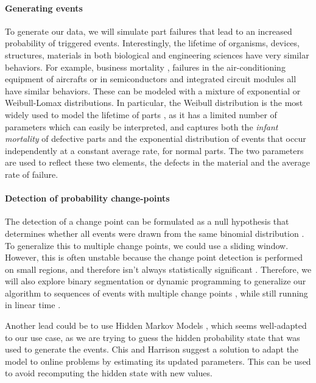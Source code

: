 \documentclass{kththesis}
\begin{document}

\paragraph{Generating events}
\label{part-lifetime}

To generate our data, we will simulate part failures that lead to an increased probability of triggered events. Interestingly, the lifetime of organisms, devices, structures, materials in both biological and engineering sciences have very similar behaviors. 
For example, business mortality \parencite{lomax1954}, failures in the air-conditioning equipment of aircrafts or in semiconductors \parencite{proschan1963} and integrated circuit modules \cite{saunders1983} all have similar behaviors. 
These can be modeled with a mixture of exponential or Weibull-Lomax distributions. In particular, the Weibull distribution \parencite{weibull1951} is the most widely used to model the lifetime of parts \parencite{anderson2005}, as it has a limited number of parameters which can easily be interpreted, and captures both the \emph{infant mortality} of defective parts and the exponential distribution of events that occur independently at a constant average rate, for normal parts. The two parameters are used to reflect these two elements, the defects in the material and the average rate of failure.


\paragraph{Detection of probability change-points}

The detection of a change point can be formulated as a null hypothesis that determines whether all events were drawn from the same binomial distribution \parencite{wasserman2004}.
To generalize this to multiple change points, we could use a sliding window. However, this is often unstable because the change point detection is performed on small regions, and therefore isn't always statistically significant \parencite{esteller2001, harchaoui2010}.
Therefore, we will also explore binary segmentation or dynamic programming to generalize our algorithm to sequences of events with multiple change points \parencite{jackson2005}, while still running in linear time \parencite{killick2012}.


Another lead could be to use Hidden Markov Models \parencite{baum1966}, which seems well-adapted to our use case, as we are trying to guess the hidden probability state that was used to generate the events. Chis and Harrison \parencite{chis2015} suggest a solution to adapt the model to online problems by estimating its updated parameters. This can be used to avoid recomputing the hidden state with new values.
\end{document}
